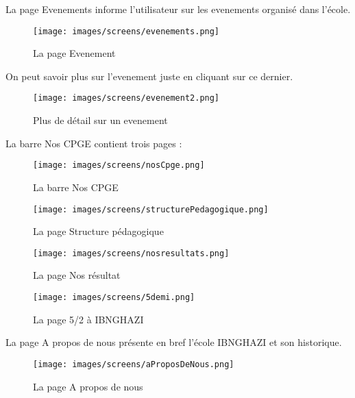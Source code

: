 La page Evenements informe l'utilisateur sur les evenements organisé dans l'école.
\begin{figure}[!h]  
\begin{center}
\texttt{[image: images/screens/evenements.png]}
\end{center}
\caption{La page Evenement}
\end{figure}
\newline
On peut savoir plus sur l'evenement juste en cliquant sur ce dernier.
\begin{figure}[!h]  
\begin{center}
\texttt{[image: images/screens/evenement2.png]}
\end{center}
\caption{Plus de détail sur un evenement}
\end{figure}
\newline

La barre Nos CPGE contient trois pages :
\begin{figure}[!h]  
\begin{center}
\texttt{[image: images/screens/nosCpge.png]}
\end{center}
\caption{La barre Nos CPGE}
\end{figure}

\begin{figure}[h]
    \begin{minipage}[c]{.46\linewidth}
        \centering
        \texttt{[image: images/screens/structurePedagogique.png]}
        \caption{La page Structure pédagogique}
    \end{minipage}
    \hfill%
    \begin{minipage}[c]{.46\linewidth}
        \centering
        \texttt{[image: images/screens/nosresultats.png]}
        \caption{La page Nos résultat}
    \end{minipage}
\end{figure}
\newpage
\begin{figure}[!h]  
\begin{center}
\texttt{[image: images/screens/5demi.png]}
\end{center}
\caption{La page 5/2 à IBNGHAZI}
\end{figure}
\newpage

La page A propos de nous présente en bref l'école IBNGHAZI et son historique.
\begin{figure}[!h]  
\begin{center}
\texttt{[image: images/screens/aProposDeNous.png]}
\end{center}
\caption{La page A propos de nous}
\end{figure}
\newpage

